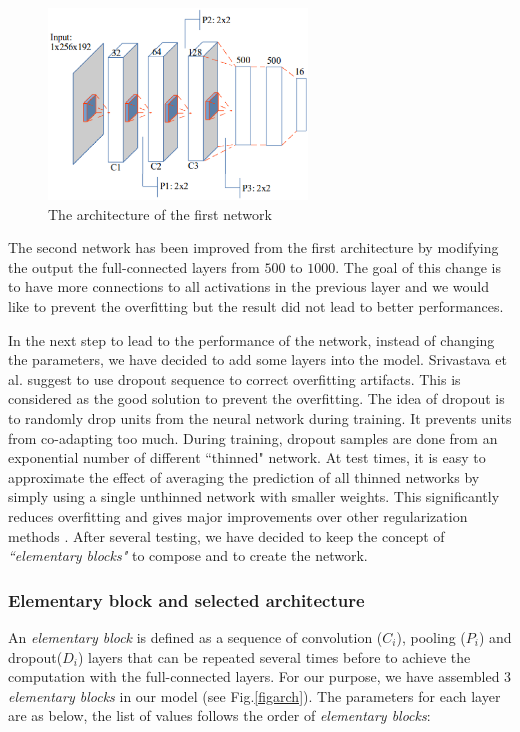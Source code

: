 \documentclass{article} %
\begin{document}
\begin{multicols}{2}
\begin{figure}[H]
	\centerline{\includegraphics[height=2in]{images/architecture1.eps}}
	\caption{\footnotesize{The architecture of the first network}}
	\label{figarch0}
\end{figure}

The second network has been improved from the first architecture by modifying the output the full-connected layers from $500$ to $1000$. The goal of this change is to have more connections to all activations in the previous layer and we would like to prevent the overfitting but the result did not lead to better performances.

In the next step to lead to the performance of the network, instead of changing the parameters, we have decided to add some layers into the model. Srivastava et al. \cite{srivastava2014dropout} suggest to use dropout sequence to correct overfitting artifacts. This is considered as the good solution to prevent the overfitting. The idea of dropout is to randomly drop units from the neural network during training. It prevents units from co-adapting too much. During training, dropout samples are done from an exponential number of different ``thinned" network. At test times, it is easy to approximate the effect of averaging the prediction of all thinned networks by simply using a single unthinned network with smaller weights. This significantly reduces overfitting and gives major improvements over other regularization methods \cite{srivastava2014dropout}. After several testing, we have decided to keep the concept of \textit{``elementary blocks"} to compose and to create the network.

\subsubsection{Elementary block and selected architecture}
An \textit{elementary block} is defined as a sequence of
convolution (\textit{$C_i$}), pooling (\textit{$P_i$}) and dropout(\textit{$D_i$}) layers that can be repeated several
times before to achieve the computation with the full-connected
layers. For our purpose, we have assembled $3$ \textit{elementary
  blocks} in our model (see Fig.\ref{figarch}). The parameters for
each layer are as below, the list of values follows the order of
\textit{elementary blocks}:


\end{multicols}
\end{document}
